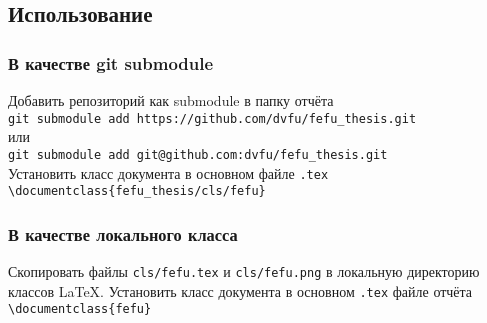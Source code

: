 \documentclass[../document.tex]{subfiles}
\begin{document}
    \subsection{Использование}
    \subsubsection{В качестве git submodule}
    \noindent Добавить репозиторий как submodule в папку отчёта\\
    \indent\texttt{git submodule add https://github.com/dvfu/fefu\_thesis.git}\\
    \noindent или\\
    \indent\texttt{git submodule add git@github.com:dvfu/fefu\_thesis.git}\\
    \noindent Установить класс документа в основном файле \texttt{.tex}\\
    \indent\texttt{\textbackslash documentclass\{fefu\_thesis/cls/fefu\}}
    \subsubsection{В качестве локального класса}
    \noindent Скопировать файлы \texttt{cls/fefu.tex} и \texttt{cls/fefu.png} в локальную директорию классов LaTeX. Установить класс документа в основном \texttt{.tex} файле отчёта\\
    \indent\texttt{\textbackslash documentclass\{fefu\}}
\end{document}

